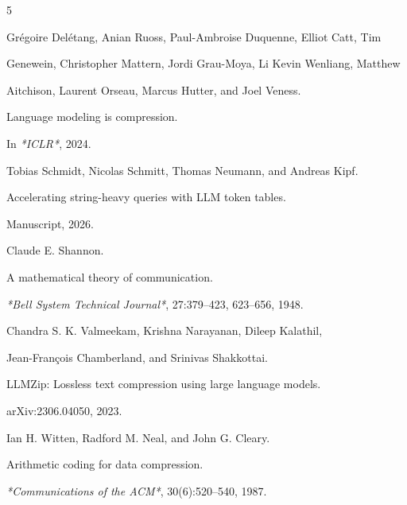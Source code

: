\documentclass{article}
\begin{document}
{\small

\begin{thebibliography}{5}


Grégoire Delétang, Anian Ruoss, Paul-Ambroise Duquenne, Elliot Catt, Tim

Genewein, Christopher Mattern, Jordi Grau-Moya, Li Kevin Wenliang, Matthew

Aitchison, Laurent Orseau, Marcus Hutter, and Joel Veness.

\newblock Language modeling is compression.

\newblock In \emph{*ICLR*}, 2024.


Tobias Schmidt, Nicolas Schmitt, Thomas Neumann, and Andreas Kipf.

\newblock Accelerating string-heavy queries with LLM token tables.

\newblock Manuscript, 2026.


Claude E. Shannon.

\newblock A mathematical theory of communication.

\newblock \emph{*Bell System Technical Journal*}, 27:379--423, 623--656, 1948.


Chandra S. K. Valmeekam, Krishna Narayanan, Dileep Kalathil,

Jean-François Chamberland, and Srinivas Shakkottai.

\newblock LLMZip: Lossless text compression using large language models.

\newblock arXiv:2306.04050, 2023.


Ian H. Witten, Radford M. Neal, and John G. Cleary.

\newblock Arithmetic coding for data compression.

\newblock \emph{*Communications of the ACM*}, 30(6):520--540, 1987.

\end{thebibliography}

}


\end{document}
